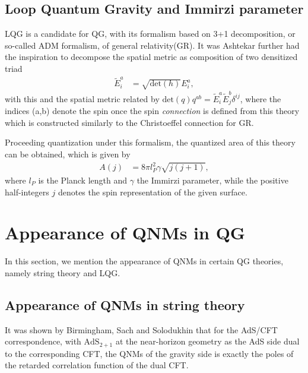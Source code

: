 \documentclass[a4paper, 12pt]{article}
\begin{document}
   \subsection{Loop Quantum Gravity and Immirzi parameter}  
   \label{sub:Loop Quantum Gravity and Immirzi parameter}
    LQG is a candidate for QG, with its formalism based on 3+1
    decomposition, or so-called ADM formalism, of general
    relativity(GR)\cite{corichi2022introduction}. It was
    Ashtekar\cite{ashtekar2021short} further
    had the inspiration to decompose the spatial metric as
    composition of two densitized triad
    \begin{align}
      \label{spatial metric lqg}
      \tilde{E}_{i}^{a} &= \sqrt{\mathrm{det}(h)} E_{i}^{a},
    \end{align} with this and the spatial metric related by \(
    \mathrm{det}(q) q^{ab} = \tilde{E}_{i}^{a} \tilde{E}_{j}^{b}
    \delta_{}^{ij} \), where the indices (a,b) denote the spin once the
    spin \textit{connection} is defined from this theory which is
    constructed similarly to the Christoeffel connection for GR. 

    Proceeding quantization under this formalism, the
    quantized area 
    of this theory can be obtained, which is given by 
    \begin{align}
      \label{area operator}
      A(j) &= 8 \pi l_{P}^{2} \gamma \sqrt{j(j+1)},    
    \end{align} where \( l_P \) is the Planck length and \( \gamma \)
    the Immirzi parameter, while the positive half-integers \( j \)
    denotes the spin representation of the given
    surface\cite{ashtekar1997quantum}. 
    

  \section{Appearance of QNMs in QG}%
    \label{sec:Appearance of QNMs in QG}
    In this section, we mention the appearance of QNMs in certain QG
    theories, namely string theory and LQG.  


    \subsection{Appearance of QNMs in string theory}%
      \label{sub:Appearance of QNMs in string theory}
      

    It was shown by Birmingham, Sach and Solodukhin that for 
    the AdS/CFT correspondence, with \( \mathrm{AdS}_{2+1} \)
    at the near-horizon geometry as the AdS side dual to the
    corresponding CFT, the QNMs of the gravity side is exactly the
    poles of the retarded correlation function of the dual CFT\cite{birmingham2002conformal}. 
\end{document}
